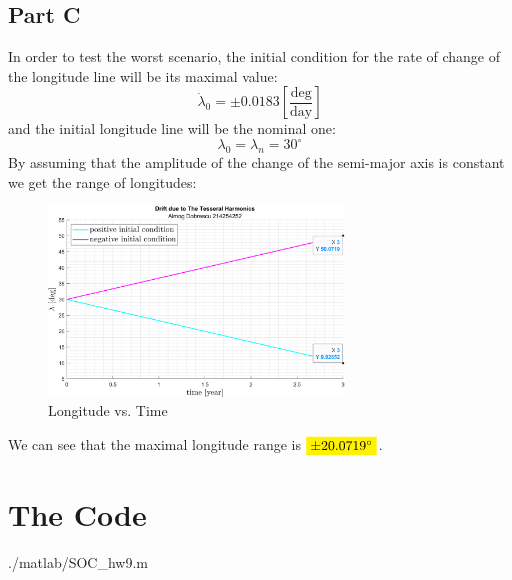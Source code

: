 \documentclass[12pt, a4paper]{article}
\begin{document}
\subsection{Part C}
In order to test the worst scenario, the initial condition for the rate of change of the longitude line will be its maximal value:
\begin{equation}
    \dot{\lambda}_0=\pm0.0183\left[\frac{\mathrm{deg}}{\mathrm{day}}\right]
\end{equation}
and the initial longitude line will be the nominal one:
\begin{equation}
    \lambda_0=\lambda_n=30^\circ
\end{equation}
By assuming that the amplitude of the change of the semi-major axis is constant we get the range of longitudes:
\begin{figure}[H]
    \centering
    \includegraphics[width=0.7\textwidth]{images/graph1.png}
    \caption{Longitude vs. Time}
    \label{fig:longitude_vs_time}
\end{figure}
We can see that the maximal longitude range is $\colorbox{yellow}{$\pm20.0719^\circ$}$.

\newpage

\appendix
\section{The Code}
\begin{lstinputlisting}[captionpos=b,stringstyle=\color{magenta},frame=single, numbers=left, style=MatLab-editor, basicstyle=\mlttfamily\small, caption={The code},mlshowsectionrules=true]{./matlab/SOC_hw9.m}
\end{lstinputlisting}
\end{document}
